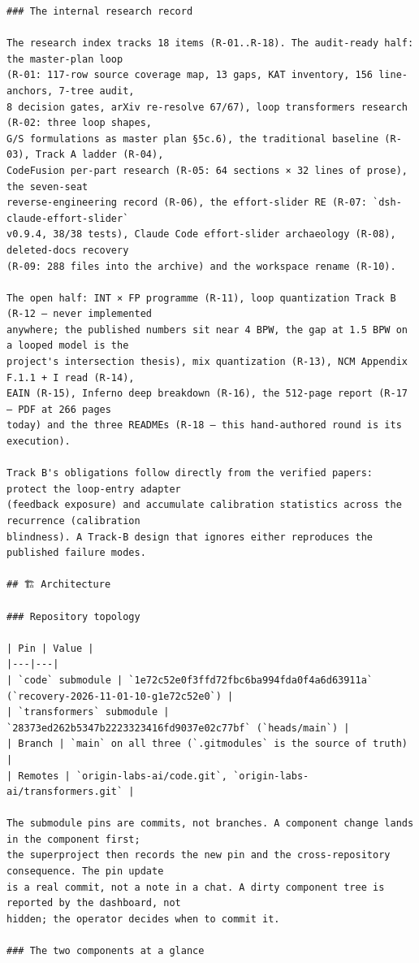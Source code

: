 \begin{Verbatim}[breaklines,breakanywhere,fontsize=\footnotesize]
### The internal research record

The research index tracks 18 items (R-01..R-18). The audit-ready half: the master-plan loop
(R-01: 117-row source coverage map, 13 gaps, KAT inventory, 156 line-anchors, 7-tree audit,
8 decision gates, arXiv re-resolve 67/67), loop transformers research (R-02: three loop shapes,
G/S formulations as master plan §5c.6), the traditional baseline (R-03), Track A ladder (R-04),
CodeFusion per-part research (R-05: 64 sections × 32 lines of prose), the seven-seat
reverse-engineering record (R-06), the effort-slider RE (R-07: `dsh-claude-effort-slider`
v0.9.4, 38/38 tests), Claude Code effort-slider archaeology (R-08), deleted-docs recovery
(R-09: 288 files into the archive) and the workspace rename (R-10).

The open half: INT × FP programme (R-11), loop quantization Track B (R-12 — never implemented
anywhere; the published numbers sit near 4 BPW, the gap at 1.5 BPW on a looped model is the
project's intersection thesis), mix quantization (R-13), NCM Appendix F.1.1 + I read (R-14),
EAIN (R-15), Inferno deep breakdown (R-16), the 512-page report (R-17 — PDF at 266 pages
today) and the three READMEs (R-18 — this hand-authored round is its execution).

Track B's obligations follow directly from the verified papers: protect the loop-entry adapter
(feedback exposure) and accumulate calibration statistics across the recurrence (calibration
blindness). A Track-B design that ignores either reproduces the published failure modes.

## 🏗️ Architecture

### Repository topology

| Pin | Value |
|---|---|
| `code` submodule | `1e72c52e0f3ffd72fbc6ba994fda0f4a6d63911a` (`recovery-2026-11-01-10-g1e72c52e0`) |
| `transformers` submodule | `28373ed262b5347b2223323416fd9037e02c77bf` (`heads/main`) |
| Branch | `main` on all three (`.gitmodules` is the source of truth) |
| Remotes | `origin-labs-ai/code.git`, `origin-labs-ai/transformers.git` |

The submodule pins are commits, not branches. A component change lands in the component first;
the superproject then records the new pin and the cross-repository consequence. The pin update
is a real commit, not a note in a chat. A dirty component tree is reported by the dashboard, not
hidden; the operator decides when to commit it.

### The two components at a glance


\end{Verbatim}
